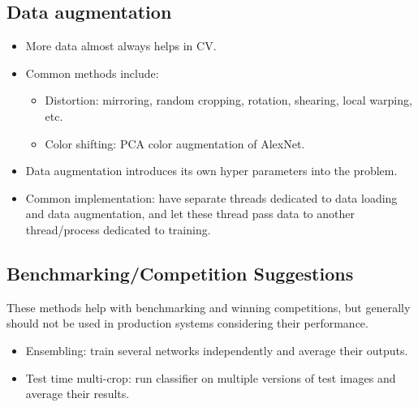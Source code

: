 \subsection{Data augmentation}
\begin{itemize}
  \item More data almost always helps in CV. 
  \item Common methods include:
  \begin{itemize}
    \item Distortion: mirroring, random cropping, rotation, shearing, local warping, etc.
    \item Color shifting: PCA color augmentation of AlexNet.
  \end{itemize}
  \item Data augmentation introduces its own hyper parameters into the problem.
  \item Common implementation: have separate threads dedicated to data loading and data augmentation, and let these thread pass data to another thread/process dedicated to training.
\end{itemize}
\subsection{Benchmarking/Competition Suggestions}
These methods help with benchmarking and winning competitions, but generally should not be used in production systems considering their performance.
\begin{itemize}
  \item Ensembling: train several networks independently and average their outputs.
  \item Test time multi-crop: run classifier on multiple versions of test images and average their results.
\end{itemize}
\ifx\PREAMBLE\undefined

\fi